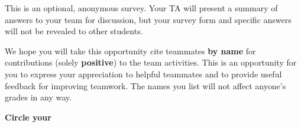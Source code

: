 \documentclass[handout]{mcs}
\begin{document}

This is an optional, anonymous survey.  Your TA will present a summary
of answers to your team for discussion, but your survey form and
specific answers will not be revealed to other students.

We hope you will take this opportunity cite teammates \textbf{by name}
for contributions (solely \textbf{positive}) to the team activities.
This is an opportunity for you to express your appreciation to helpful
teammates and to provide useful feedback for improving teamwork.  The
names you list will not affect anyone's grades in any way.

\begin{center}
\textbf{Circle your}\quad   \teaminfo 
\end{center}
\end{document}
